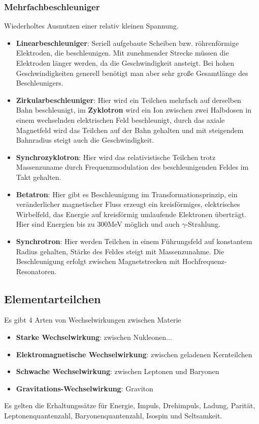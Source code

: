 \documentclass[12pt,a4paper,ngerman]{article}
\begin{document}
\subsubsection*{Mehrfachbeschleuniger}
Wiederholtes Ausnutzen einer relativ kleinen Spannung.
\begin{itemize}
\item \textbf{Linearbeschleuniger}: Seriell aufgebaute Scheiben bzw. röhrenförmige Elektroden, die beschleunigen. Mit zunehmender Strecke müssen die Elektroden länger werden, da die Geschwindigkeit ansteigt. Bei hohen Geschwindigkeiten generell benötigt man aber sehr große Gesamtlänge des Beschleunigers. 
\item \textbf{Zirkularbeschleuniger}: Hier wird ein Teilchen mehrfach auf derselben Bahn beschleunigt, im \textbf{Zyklotron} wird ein Ion zwischen zwei Halbdosen in einem wechselnden elektrischen Feld beschleunigt, durch das axiale Magnetfeld wird das Teilchen auf der Bahn gehalten und mit steigendem Bahnradius steigt auch die Geschwindigkeit. 
\item \textbf{Synchrozyklotron}: Hier wird das relativistische Teilchen trotz Massenzuname durch Frequenzmodulation des beschleunigenden Feldes im Takt gehalten.
\item \textbf{Betatron}: Hier gibt es Beschleunigung im Transformationsprinzip, ein veränderlicher magnetischer Fluss erzeugt ein kreisförmiges, elektrisches Wirbelfeld, das Energie auf kreisförmig umlaufende Elektronen überträgt. Hier sind Energien bis zu 300MeV möglich und auch $\gamma$-Strahlung. 
\item \textbf{Synchrotron}: Hier werden Teilchen in einem Führungsfeld auf konstantem Radius gehalten, Stärke des Feldes steigt mit Massenzunahme. Die Beschleunigung erfolgt zwischen Magnetstrecken mit Hochfrequenz-Resonatoren. 
\end{itemize}


\subsection{Elementarteilchen}
Es gibt 4 Arten von Wechselwirkungen zwischen Materie
\begin{itemize}
\item \textbf{Starke Wechselwirkung}: zwischen Nukleonen...
\item \textbf{Elektromagnetische Wechselwirkung}: zwischen geladenen Kernteilchen
\item \textbf{Schwache Wechselwirkung}: zwischen Leptonen und Baryonen
\item \textbf{Gravitations-Wechselwirkung}: Graviton
\end{itemize}
Es gelten die Erhaltungssätze für Energie, Impuls, Drehimpuls, Ladung, Parität, Leptonenquantenzahl, Baryonenquantenzahl, Isospin und Seltsamkeit. 
\end{document}
